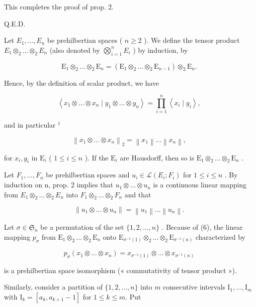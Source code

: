 This completes the proof of prop. 2.

Q.E.D.

Let \(E_1, \ldots, E_n\) be prehilbertian spaces ( \(n \geqslant 2\) ). We define the tensor product \(E_1 \otimes_2 \ldots \otimes_2 E_n\) (also denoted by \(\bigotimes_{i=1}^{n} E_i\) ) by induction, by

\[
\mathrm{E} _ {1} \otimes_ {2} \dots \otimes_ {2} \mathrm{E} _ {n} = (\mathrm{E} _ {1} \otimes_ {2} \dots \otimes_ {2} \mathrm{E} _ {n - 1}) \otimes_ {2} \mathrm{E} _ {n}.
\]

Hence, by the definition of scalar product, we have

\[
\left\langle x _ {1} \otimes \dots \otimes x _ {n} \mid y _ {1} \otimes \dots \otimes y _ {n} \right\rangle = \prod_ {i = 1} ^ {n} \left\langle x _ {i} \mid y _ {i} \right\rangle ,\tag{6}
\]

and in particular \(^{1}\)

\[
\left\| x _ {1} \otimes \dots \otimes x _ {n} \right\| _ {2} = \left\| x _ {1} \right\| \dots \left\| x _ {n} \right\|,\tag{7}
\]

for \(x_{i},y_{i}\) in \(\mathrm{E}_i\) ( \(1\leqslant i\leqslant n\) ). If the \(\mathrm{E}_i\) are Hausdorff, then so is \(\mathrm{E}_1\otimes_2\dots \otimes_2\mathrm{E}_n\) .

Let \(F_{1}, \ldots, F_{n}\) be prehilbertian spaces and \(u_{i} \in \mathcal{L}(E_{i}; F_{i})\) for \(1 \leqslant i \leqslant n\) . By induction on n, prop. 2 implies that \(u_{1} \otimes \ldots \otimes u_{n}\) is a continuous linear mapping from \(E_{1} \otimes_{2} \ldots \otimes_{2} E_{n}\) into \(F_{1} \otimes_{2} \ldots \otimes_{2} F_{n}\) and that

\[
\left\| u _ {1} \otimes \dots \otimes u _ {n} \right\| = \left\| u _ {1} \right\| \dots \left\| u _ {n} \right\|.\tag{8}
\]

Let \(\sigma \in \mathfrak{S}_n\) be a permutation of the set \(\{1, 2, \dots, n\}\) . Because of (6), the linear mapping \(p_{\sigma}\) from \(\mathrm{E}_1 \otimes_2 \dots \otimes_2 \mathrm{E}_n\) onto \(\mathrm{E}_{\sigma^{-1}(1)} \otimes_2 \dots \otimes_2 \mathrm{E}_{\sigma^{-1}(n)}\) characterized by

\[
p _ {\sigma} \left(x _ {1} \otimes \dots \otimes x _ {n}\right) = x _ {\sigma^ {- 1} (1)} \otimes \dots \otimes x _ {\sigma^ {- 1} (n)}\tag{9}
\]

is a prehilbertian space isomorphism (« commutativity of tensor product »).

Similarly, consider a partition of \(\{1, 2, \dots , n\}\) into \(m\) consecutive intervals \(\mathrm{I}_{1}, \dots , \mathrm{I}_{m}\) with \(\mathrm{I}_{k} = [a_{k}, a_{k + 1} - 1]\) for \(1 \leqslant k \leqslant m\). Put

